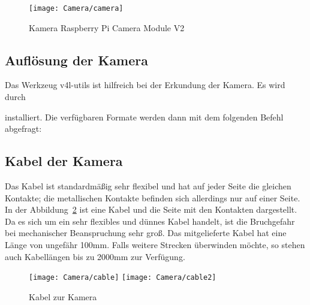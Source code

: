 
\begin{figure}
	\centering
	\texttt{[image: Camera/camera]} 
	\caption{Kamera Raspberry Pi Camera Module V2\cite{RaspberryPi3:2019}}\label{SmartPiCam:Camera}
\end{figure}


\subsection{Auflösung der Kamera}

Das Werkzeug v4l-utils ist hilfreich bei der Erkundung der Kamera. Es wird durch


\medskip
    
    
    \medskip

installiert. Die verfügbaren Formate werden dann mit dem folgenden Befehl abgefragt:

\medskip






\subsection{Kabel der Kamera}


Das Kabel ist standardmäßig sehr flexibel und hat auf jeder Seite die gleichen Kontakte; die metallischen Kontakte befinden sich allerdings nur auf einer Seite. In der Abbildung~\ref{SmartPiCam:Camera} ist eine Kabel und die Seite mit den Kontakten dargestellt.  Da es sich um ein sehr flexibles und dünnes Kabel handelt, ist die Bruchgefahr bei mechanischer Beanspruchung sehr groß. Das mitgelieferte Kabel hat eine Länge von ungefähr 100mm. Falls weitere Strecken überwinden möchte, so stehen auch Kabellängen bis zu 2000mm zur Verfügung. 

\begin{figure}
    \centering
    \texttt{[image: Camera/cable]} 
    \quad 
    \texttt{[image: Camera/cable2]} 
    \caption{Kabel zur Kamera \cite{RaspberryPi3:2019}}\label{SmartPiCam:Camera}
\end{figure}


